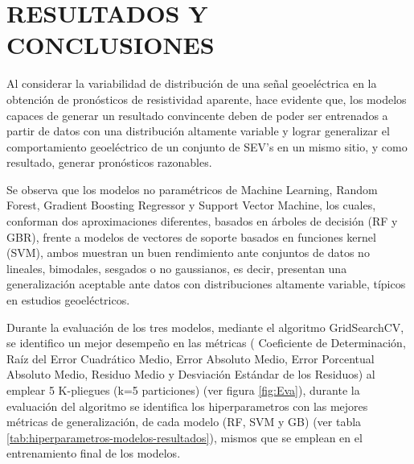 \chapter{RESULTADOS Y CONCLUSIONES}

Al considerar la variabilidad de distribución de una señal geoeléctrica en la obtención de pronósticos de resistividad aparente, hace evidente que, los modelos capaces de generar un resultado convincente deben de poder ser entrenados a partir de datos con una distribución altamente variable y lograr generalizar el comportamiento geoeléctrico de un conjunto de SEV's en un mismo sitio, y como resultado, generar pronósticos razonables.  

Se observa que los modelos no paramétricos de Machine Learning, Random Forest, Gradient Boosting Regressor y Support Vector Machine, los cuales, conforman dos aproximaciones diferentes, basados en árboles de decisión (RF y GBR), frente a modelos de vectores de soporte basados en funciones kernel (SVM), ambos muestran un buen rendimiento ante conjuntos de datos no lineales, bimodales, sesgados o no gaussianos, es decir, presentan una generalización aceptable ante datos con distribuciones altamente variable, típicos en estudios geoeléctricos.


Durante la evaluación de los tres modelos, mediante el algoritmo GridSearchCV, se identifico un mejor desempeño en las métricas ( Coeficiente de Determinación, Raíz del Error Cuadrático Medio, Error Absoluto Medio, Error Porcentual Absoluto Medio, Residuo Medio y Desviación Estándar de los Residuos) al emplear 5 K-pliegues (k=5 particiones) (ver figura \ref{fig:Eva}), durante la evaluación del algoritmo se identifica los hiperparametros con las mejores métricas de generalización, de cada modelo (RF, SVM y GB) (ver tabla \ref{tab:hiperparametros-modelos-resultados}), mismos que se emplean en el entrenamiento final de los modelos.




